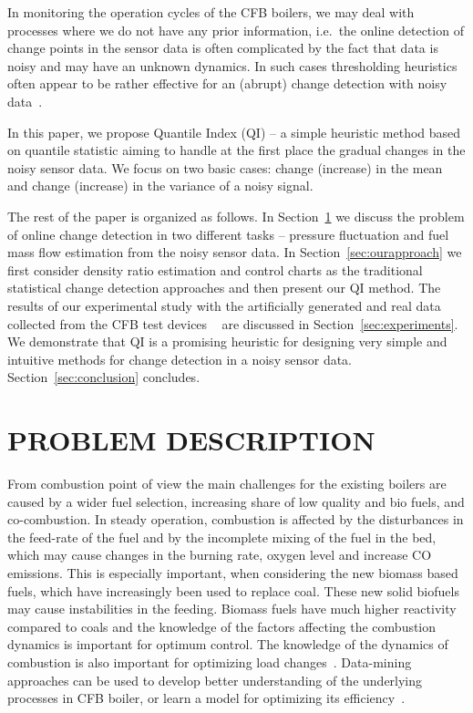 In monitoring the operation cycles of the CFB boilers, we may deal with processes where we do not have any prior information, i.e.\ the online detection of change points in the sensor data is often complicated by the fact that data is noisy and may have an unknown dynamics.
In such cases thresholding heuristics often appear to be rather effective for an (abrupt) change detection with noisy data~\cite{ZliobaiteBP09}. 

In this paper, we propose Quantile Index (QI) -- a simple heuristic method based on quantile statistic aiming to handle at the first place the gradual changes in the noisy sensor data.
We focus on two basic cases: change (increase) in the mean and change (increase) in the variance of a noisy signal.

The rest of the paper is organized as follows.
In Section~\ref{sec:problem} we discuss the problem of online change detection in two different tasks -- pressure fluctuation and fuel mass flow estimation from the noisy sensor data.
In Section~\ref{sec:ourapproach} we first consider density ratio estimation and control charts as the traditional statistical change detection approaches and then present our QI method.
The results of our experimental study with the artificially generated and real data collected from the CFB test devices ~\cite{Tourunen,Gulden} are discussed in Section~\ref{sec:experiments}.
We demonstrate that QI is a promising heuristic for designing very simple and intuitive methods for change detection in a noisy sensor data.
Section~\ref{sec:conclusion} concludes.

\section{PROBLEM DESCRIPTION}
\label{sec:problem}

From combustion point of view the main challenges for the existing boilers are caused by a wider fuel selection, increasing share of low quality and bio fuels, and co-combustion. In steady operation, combustion is affected by the disturbances in the feed-rate of the fuel and by the incomplete mixing of the fuel in the bed, which may cause changes in the burning rate, oxygen level and increase CO emissions. This is especially important, when considering the new biomass based fuels, which have increasingly been used to replace coal.
These new solid biofuels may cause instabilities in the feeding. 
Biomass fuels have much higher reactivity compared to coals and the knowledge of the factors affecting the combustion dynamics is important for optimum control. The knowledge of the dynamics of combustion is also important for optimizing load changes~\cite{Saastamoinen04}. Data-mining approaches can be used to develop better understanding of the underlying processes in CFB boiler, or learn a model for optimizing its efficiency~\cite{PechenizkiyEtAl06}.


